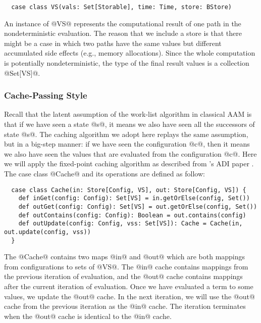 \documentclass[acmsmall, screen]{acmart}\settopmatter{}
\begin{document}
\begin{lstlisting}
  case class VS(vals: Set[Storable], time: Time, store: BStore)
\end{lstlisting}

An instance of @VS@ represents the computational result of one path in the nondeterministic
evaluation. The reason that we include a store is that there might be a case in which two
paths have the same values but different accumulated side effects (e.g., memory allocations).
Since the whole computation is potentially nondeterministic, the type of the final result
values is a collection @Set[VS]@.

\subsubsection{Cache-Passing Style}

Recall that the latent assumption of the work-list algorithm in classical AAM is that
if we have seen a state @s@, it means we also have seen all the successors of state @s@.
The caching algorithm we adopt here replays the same assumption, but in a big-step
manner: if we have seen the configuration @c@, then it means we also have seen the
values that are evaluated from the configuration @c@.
Here we will apply the fixed-point caching algorithm as described from
\citeauthor{darais2017abstracting}'s ADI paper \cite{darais2017abstracting}.
The case class @Cache@ and its operations are defined as follow:

\begin{lstlisting}
  case class Cache(in: Store[Config, VS], out: Store[Config, VS]) {
    def inGet(config: Config): Set[VS] = in.getOrElse(config, Set())
    def outGet(config: Config): Set[VS] = out.getOrElse(config, Set())
    def outContains(config: Config): Boolean = out.contains(config)
    def outUpdate(config: Config, vss: Set[VS]): Cache = Cache(in, out.update(config, vss))
  }
\end{lstlisting}

The @Cache@ contains two maps @in@ and @out@ which are both mappings from configurations
to sets of @VS@. The @in@ cache contains mappings from the previous iteration of evaluation,
and the @out@ cache contains mappings after the current iteration of evaluation.
Once we have evaluated a term to some values, we update the @out@ cache. In the next
iteration, we will use the @out@ cache from the previous iteration as the @in@ cache.
The iteration terminates when the @out@ cache is identical to the @in@ cache.
\end{document}
